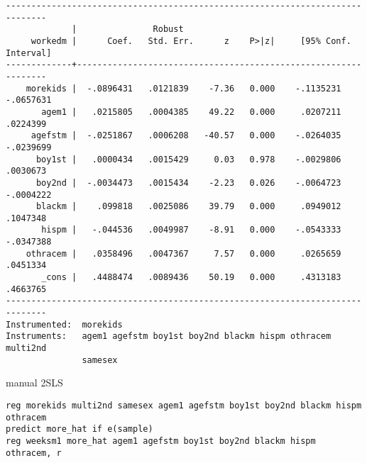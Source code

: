 \documentclass[cache=false]{article}
\begin{document}
\begin{verbatim}
------------------------------------------------------------------------------
             |               Robust
     workedm |      Coef.   Std. Err.      z    P>|z|     [95% Conf. Interval]
-------------+----------------------------------------------------------------
    morekids |  -.0896431   .0121839    -7.36   0.000    -.1135231   -.0657631
       agem1 |   .0215805   .0004385    49.22   0.000     .0207211    .0224399
     agefstm |  -.0251867   .0006208   -40.57   0.000    -.0264035   -.0239699
      boy1st |   .0000434   .0015429     0.03   0.978    -.0029806    .0030673
      boy2nd |  -.0034473   .0015434    -2.23   0.026    -.0064723   -.0004222
      blackm |    .099818   .0025086    39.79   0.000     .0949012    .1047348
       hispm |   -.044536   .0049987    -8.91   0.000    -.0543333   -.0347388
    othracem |   .0358496   .0047367     7.57   0.000     .0265659    .0451334
       _cons |   .4488474   .0089436    50.19   0.000     .4313183    .4663765
------------------------------------------------------------------------------
Instrumented:  morekids
Instruments:   agem1 agefstm boy1st boy2nd blackm hispm othracem multi2nd
               samesex
\end{verbatim}

manual 2SLS
\begin{verbatim}
reg morekids multi2nd samesex agem1 agefstm boy1st boy2nd blackm hispm othracem
predict more_hat if e(sample)
reg weeksm1 more_hat agem1 agefstm boy1st boy2nd blackm hispm othracem, r
\end{verbatim}
\end{document}
